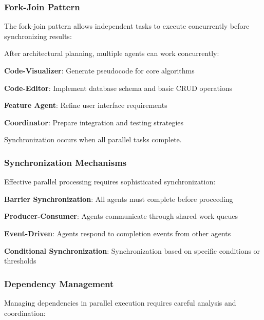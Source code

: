 \subsubsection*{Fork-Join Pattern}

The fork-join pattern allows independent tasks to execute concurrently before synchronizing results:

\begin{infobox}[title=Parallel Execution Example]
After architectural planning, multiple agents can work concurrently:
\begin{compactlist}
    \item \textbf{Code-Visualizer}: Generate pseudocode for core algorithms
    \item \textbf{Code-Editor}: Implement database schema and basic CRUD operations
    \item \textbf{Feature Agent}: Refine user interface requirements
    \item \textbf{Coordinator}: Prepare integration and testing strategies
\end{compactlist}
Synchronization occurs when all parallel tasks complete.
\end{infobox}

\subsubsection*{Synchronization Mechanisms}

Effective parallel processing requires sophisticated synchronization:

\begin{expandedlist}
    \item \textbf{Barrier Synchronization}: All agents must complete before proceeding
    \item \textbf{Producer-Consumer}: Agents communicate through shared work queues
    \item \textbf{Event-Driven}: Agents respond to completion events from other agents
    \item \textbf{Conditional Synchronization}: Synchronization based on specific conditions or thresholds
\end{expandedlist}

\subsubsection*{Dependency Management}

Managing dependencies in parallel execution requires careful analysis and coordination:

